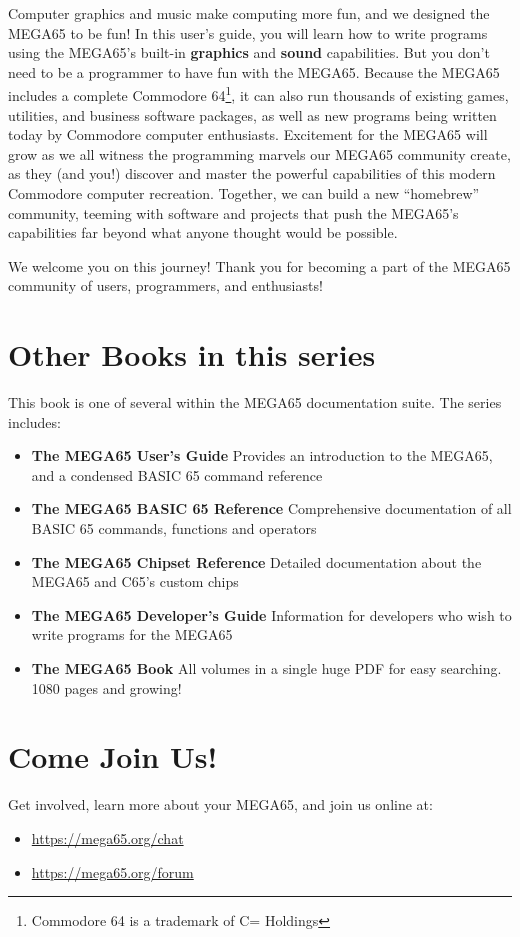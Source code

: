 Computer graphics and music make computing more fun, and we designed the MEGA65 to be fun! In this user's guide, you will learn how to write programs using the MEGA65's built-in {\bf graphics} and {\bf sound} capabilities. But you don't need to be a programmer to have fun with the MEGA65. Because the MEGA65 includes a complete Commodore{\textregistered} 64{\texttrademark}\footnote{Commodore 64 is a trademark of C= Holdings}, it can also run thousands of existing games, utilities, and business software packages, as well as new programs being written today by Commodore computer enthusiasts. Excitement for the MEGA65 will grow as we all witness the programming marvels our MEGA65 community create, as they (and you!) discover and master the powerful capabilities of this modern Commodore computer recreation. Together, we can build a new ``homebrew'' community, teeming with software and projects that push the MEGA65's capabilities far beyond what anyone thought would be possible.

We welcome you on this journey! Thank you for becoming a part of the MEGA65
community of users, programmers, and enthusiasts!

\section{Other Books in this series}

This book is one of several within the MEGA65 documentation suite. The series includes:

\begin{itemize}
  \item {\bf The MEGA65 User's Guide} \newline
      Provides an introduction to the MEGA65, and a condensed BASIC 65 command reference
    \item {\bf The MEGA65 BASIC 65 Reference} \newline
      Comprehensive documentation of all BASIC 65 commands, functions and operators
    \item {\bf The MEGA65 Chipset Reference} \newline
      Detailed documentation about the MEGA65 and C65's custom chips
    \item {\bf The MEGA65 Developer's Guide} \newline
      Information for developers who wish to write programs for the MEGA65
    \item {\bf The MEGA65 Book} \newline
      All volumes in a single huge PDF for easy searching. 1080 pages and growing!
\end{itemize}

\section{Come Join Us!}
Get involved, learn more about your MEGA65, and join us online at:

\begin{itemize}
    \item \url{https://mega65.org/chat}
    \item \url{https://mega65.org/forum}
\end{itemize}
